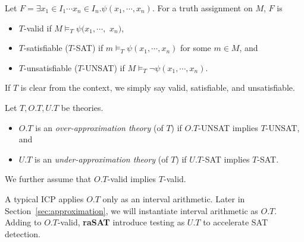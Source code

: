 \begin{definition} \label{def:app}
Let $F = \exists x_1 \in I_1 \cdots x_n \in I_n. \psi(x_1,\cdots,x_n)$. 
For a truth assignment on $M$, $F$ is 
\begin{itemize}
\item $T$-valid if $M \models_T \psi(x_1,\cdots,$ $x_n)$, 
\item $T$-satisfiable ($T$-SAT) if $m \models_T \psi(x_1,\cdots,x_n)$ 
for some $m \in M$, and 
\item $T$-unsatisfiable ($T$-UNSAT) if $M \models_T \neg \psi(x_1,\cdots,x_n)$. 
\end{itemize}
If $T$ is clear from the context, we simply say valid, satisfiable, and unsatisfiable. 
\end{definition}


\begin{definition} \label{def:ApproxTheory}
Let $T, O.T, U.T$ be theories. 
\begin{itemize}
\item $O.T$ is an {\em over-approximation theory} (of $T$) 
if $O.T$-UNSAT implies $T$-UNSAT, and
\item $U.T$ is an {\em under-approximation theory} (of $T$)
if $U.T$-SAT implies $T$-SAT. 
\end{itemize}
We further assume that $O.T$-valid implies $T$-valid. 
\end{definition}

A typical ICP applies $O.T$ only as an interval arithmetic. 
Later in Section~\ref{sec:approximation}, we will instantiate interval arithmetic as $O.T$. 
Adding to $O.T$-valid, {\bf raSAT} introduce testing as $U.T$ to accelerate SAT detection. 
